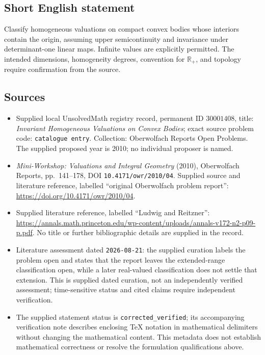 \documentclass[11pt]{article}
\begin{document}
\subsection{Short English statement}
Classify homogeneous valuations on compact convex bodies whose interiors contain the origin, assuming upper semicontinuity and invariance under determinant-one linear maps. Infinite values are explicitly permitted. The intended dimensions, homogeneity degrees, convention for \(\mathbb R_+\), and topology require confirmation from the source.
\subsection{Sources}
\begin{itemize}
\item Supplied local UnsolvedMath registry record, permanent ID \(30001408\), title: \emph{Invariant Homogeneous Valuations on Convex Bodies}; exact source problem code: \texttt{catalogue entry}. Collection: Oberwolfach Reports Open Problems. The supplied proposed year is 2010; no individual proposer is named.
\item \emph{Mini-Workshop: Valuations and Integral Geometry} (2010), Oberwolfach Reports, pp.\ 141--178, DOI \texttt{10.4171/owr/2010/04}. Supplied source and literature reference, labelled ``original Oberwolfach problem report'': \url{https://doi.org/10.4171/owr/2010/04}.
\item Supplied literature reference, labelled ``Ludwig and Reitzner'': \url{https://annals.math.princeton.edu/wp-content/uploads/annals-v172-n2-p09-p.pdf}. No title or further bibliographic details are supplied in the record.
\item Literature assessment dated \texttt{2026-08-21}: the supplied curation labels the problem open and states that the report leaves the extended-range classification open, while a later real-valued classification does not settle that extension. This is supplied dated curation, not an independently verified assessment; time-sensitive status and cited claims require independent verification.
\item The supplied statement status is \texttt{corrected\_verified}; its accompanying verification note describes enclosing TeX notation in mathematical delimiters without changing the mathematical content. This metadata does not establish mathematical correctness or resolve the formulation qualifications above.
\end{itemize}
\end{document}
